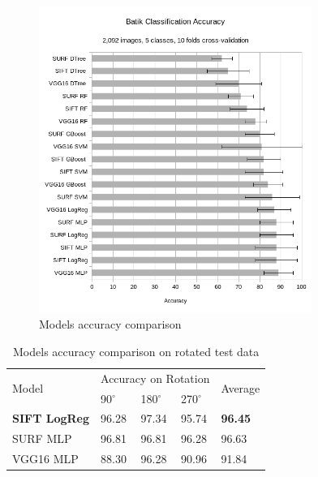\documentclass[conference, compsoc]{IEEEtran}
\begin{document}
\begin{figure}[t]
	\begin{center}
		\includegraphics[width=3.5in]{../chart_accuracy_rev}
		\renewcommand{\figurename}{Fig.}
		\caption{Models accuracy comparison}
		\label{fig_accuracy_comparison}
	\end{center}
\end{figure}

\begin{table}[t]
	\begin{center}
		\caption{Models accuracy comparison on rotated test data}
		\label{tab_experiment_rotated}	
		\begin{tabular}{lllll}
		    \toprule
			\multirow{2}{*}[-3pt]{Model}  & \multicolumn{3}{c}{Accuracy on Rotation} & \multirow{2}{*}[-3pt]{Average} \\ 
		    \cmidrule{2-4} 
		  & 90$^{\circ}$ & 180$^{\circ}$ & 270$^{\circ}$ & \\ 
		     \midrule
\textbf{SIFT LogReg} & 96.28 & 97.34 & 95.74 & \textbf{96.45} \\
SURF MLP & 96.81 & 96.81 & 96.28 & 96.63 \\
VGG16 MLP & 88.30 & 96.28 & 90.96 & 91.84 \\
		    \bottomrule
		\end{tabular}
	\end{center}
\end{table} 
\end{document}
